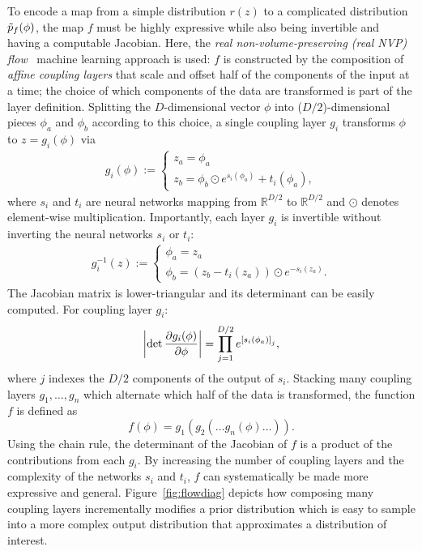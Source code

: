 %
To encode a map from a simple distribution $r(z)$ to a complicated distribution $\tilde{p}_f(\phi)$, the map $f$ must be highly expressive while also being invertible and having a computable Jacobian. Here, the {\it real non-volume-preserving (real NVP) flow}~\cite{Dinh2016} machine learning approach is used: $f$ is constructed by the composition of {\it affine coupling layers} that scale and offset half of the components of the input at a time; the choice of which components of the data are transformed is part of the layer definition. Splitting the $D$-dimensional vector $\phi$ into ($D/2$)-dimensional pieces $\phi_a$ and $\phi_b$ according to this choice, a single coupling layer $g_i$ transforms $\phi$ to $z = g_i (\phi)$ via
%
\begin{align}\label{eq:affinecoupling}
    g_i(\phi) := \begin{cases}
    z_a = \phi_a  \\
    z_b = \phi_b \odot e^{s_i(\phi_a)} + t_i(\phi_a),
    \end{cases}
\end{align}
%
where $s_i$ and $t_i$ are neural networks mapping from $\mathbb{R}^{D/2}$ to $\mathbb{R}^{D/2}$ and $\odot$ denotes element-wise multiplication. Importantly, each layer $g_i$ is invertible without inverting the neural networks $s_i$ or $t_i$:
%
\begin{align}\label{eq:inv-affine-coupling}
    g_i^{-1}(z) := \begin{cases}
    \phi_a = z_a  \\
    \phi_b = (z_b - t_i(z_a)) \odot e^{-s_i(z_a)}.
    \end{cases}
\end{align}
%
The Jacobian matrix is lower-triangular and its determinant can be easily computed. For coupling layer $g_i$:
%
\begin{equation}
    \left| \det \frac{\partial g_i(\phi)}{\partial \phi} \right| = \prod_{j=1}^{D/2} e^{\left[ s_i(\phi_a) \right]_j},
\end{equation}
where $j$ indexes the $D/2$ components of the output of $s_i$.
%
Stacking many coupling layers $g_1, \dots, g_n$ which alternate which half of the data is transformed, the function $f$ is defined as
%
\begin{equation}
    f(\phi) = g_1 (g_2 ( \dots g_{n} (\phi) \dots ) ).
\end{equation}
%
Using the chain rule, the determinant of the Jacobian of $f$ is a product of the contributions from each $g_i$. By increasing the number of coupling layers and the complexity of the networks $s_i$ and $t_i$, $f$ can systematically be made more expressive and general. Figure~\ref{fig:flowdiag} depicts how composing many coupling layers incrementally modifies a prior distribution which is easy to sample into a more complex output distribution that approximates a distribution of interest.


